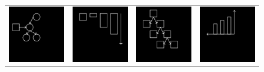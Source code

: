 \documentclass{article}
\begin{document}
\begin{figure}[h]
\begin{minipage}[t]{0.7\linewidth}
\begin{tabular}{llll}
  \includegraphics[width = \exampleImageSize]{figures/60.png}&
  \includegraphics[width = \exampleImageSize]{figures/5.png}&
    \includegraphics[width = \exampleImageSize]{figures/17.png}&
    \includegraphics[width = \exampleImageSize]{figures/58.png}

\end{tabular}
\end{minipage}
\end{figure}
\end{document}
